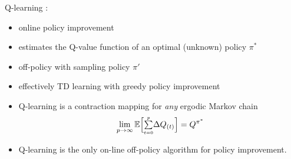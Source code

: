 \begin{frame}
{	\svspace{-3mm}
	
	}

\end{frame}

\begin{frame}\frametitle{\subsecname}

Q-learning \citep{Watkins92}:
\begin{itemize}
\item online policy improvement
\item estimates the Q-value function of an optimal (unknown) policy $\pi^*$
\item off-policy with sampling policy $\pi'$
\item effectively TD learning with greedy policy improvement
\item Q-learning is a contraction mapping for \emph{any} ergodic Markov chain
			\begin{equation}
				\lim\limits_{p \to \infty} \mathbb{E} \Big\lbrack
					{\textstyle \sum\limits_{\scriptscriptstyle t=0}^{\scriptscriptstyle p}} \Delta Q_{(t)} \Big\rbrack
				= Q^{\pi^*}
			\end{equation}
\item Q-learning is the only on-line off-policy algorithm for policy improvement.
\end{itemize}

\end{frame}
